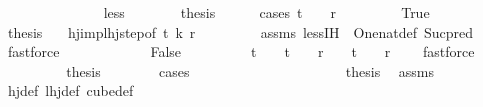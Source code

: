 \begin{isabellebody}
\ \ \isamarkupfalse%
\isanewline
\ \ \ \ \isamarkupfalse%
\ {}\isanewline
\ \ \ \ \isamarkupfalse%
\ less\isanewline
\ \ \ \ \isamarkupfalse%
\ \isamarkupfalse%
\ {\isacharquery}{\kern0pt}thesis\isanewline
\ \ \ \ \isamarkupfalse%
\ {\isacharparenleft}{\kern0pt}cases\ {\isachardoublequoteopen}t\ {\isachargreater}{\kern0pt}\ {}\ {\isasymand}\ r\ {\isachargreater}{\kern0pt}\ {}{\isachardoublequoteclose}{\isacharparenright}{\kern0pt}\isanewline
\ \ \ \ \ \isamarkupfalse%
\ True\isanewline
\ \ \ \ \ \isamarkupfalse%
\ \isamarkupfalse%
\ {\isacharquery}{\kern0pt}thesis\ \ \isamarkupfalse%
\ hj{\isacharunderscore}{\kern0pt}imp{\isacharunderscore}{\kern0pt}lhj{\isacharunderscore}{\kern0pt}step{\isacharbrackleft}{\kern0pt}of\ t\ {\isachardoublequoteopen}k{\isacharminus}{\kern0pt}{}{\isachardoublequoteclose}\ r{\isacharbrackright}{\kern0pt}\isanewline
\ \ \ \ \ \ \ \isamarkupfalse%
\ assms\ less{\isachardot}{\kern0pt}IH\ {}\ One{\isacharunderscore}{\kern0pt}nat{\isacharunderscore}{\kern0pt}def\ Suc{\isacharunderscore}{\kern0pt}pred\ \isamarkupfalse%
\ fastforce\isanewline
\ \ \ \ \isamarkupfalse%
\isanewline
\ \ \ \ \ \ \isamarkupfalse%
\ False\isanewline
\ \ \ \ \ \ \isamarkupfalse%
\ \isamarkupfalse%
\ {\isachardoublequoteopen}t\ {\isacharequal}{\kern0pt}\ {}{\isachardoublequoteclose}\ {\isacharbar}{\kern0pt}\ {\isachardoublequoteopen}t\ {\isachargreater}{\kern0pt}\ {}\ {\isasymand}\ r\ {\isacharequal}{\kern0pt}\ {}{\isachardoublequoteclose}\ {\isacharbar}{\kern0pt}\ {\isachardoublequoteopen}t\ {\isacharequal}{\kern0pt}\ {}\ {\isasymand}\ r\ {\isacharequal}{\kern0pt}\ {}{\isachardoublequoteclose}\ \isamarkupfalse%
\ fastforce\isanewline
\ \ \ \ \ \ \isamarkupfalse%
\ \isamarkupfalse%
\ {\isacharquery}{\kern0pt}thesis\isanewline
\ \ \ \ \ \ \isamarkupfalse%
\ cases\isanewline
\ \ \ \ \ \ \ \ \isamarkupfalse%
\ {}\isanewline
\ \ \ \ \ \ \ \ \isamarkupfalse%
\ \isamarkupfalse%
\ {\isacharquery}{\kern0pt}thesis\ \isamarkupfalse%
\ assms\ \isamarkupfalse%
\ hj{\isacharunderscore}{\kern0pt}def\ lhj{\isacharunderscore}{\kern0pt}def\ cube{\isacharunderscore}{\kern0pt}def\ \isamarkupfalse%

\end{isabellebody}
